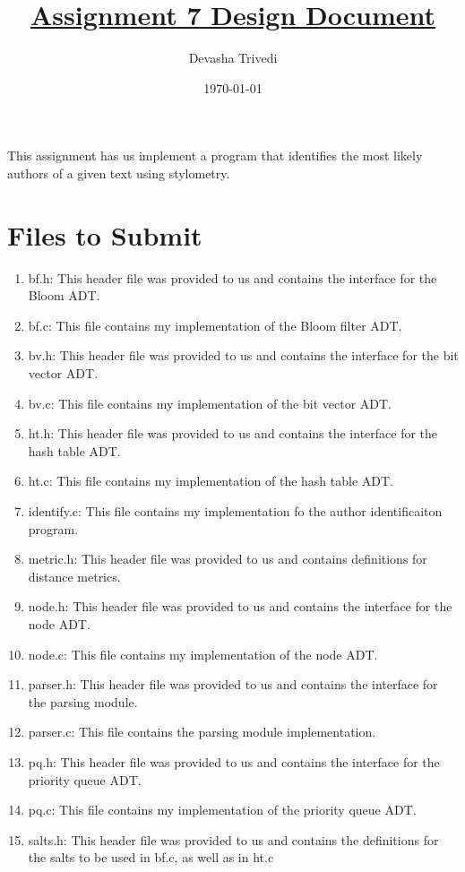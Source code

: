 \documentclass[12pt]{article}
\title{\textbf{\underline{Assignment 7 Design Document}}}
\author{Devasha Trivedi}
\date{\today}
\begin{document}
\maketitle
This assignment has us implement a program that identifies the most likely authors of a given text using stylometry.

\section{Files to Submit}\label{ss:deliverables}
\begin{enumerate}
    \item bf.h: This header file was provided to us and contains the interface for the Bloom ADT.
    \item bf.c: This file contains my implementation of the Bloom filter ADT.
    \item bv.h: This header file was provided to us and contains the interface for the bit vector ADT.
    \item bv.c: This file contains my implementation of the bit vector ADT.
    \item ht.h: This header file was provided to us and contains the interface for the hash table ADT.
    \item ht.c: This file contains my implementation of the hash table ADT.
    \item identify.c: This file contains my implementation fo the author identificaiton program.
    \item metric.h: This header file was provided to us and contains definitions for distance metrics.
    \item node.h: This header file was provided to us and contains the interface for the node ADT.
    \item node.c: This file contains my implementation of the node ADT.
    \item parser.h: This header file was provided to us and contains the interface for the parsing module.
    \item parser.c: This file contains the parsing module implementation.
    \item pq.h: This header file was provided to us and contains the interface for the priority queue ADT.
    \item pq.c: This file contains my implementation of the priority queue ADT.
    \item salts.h: This header file was provided to us and contains the definitions for the salts to be used in bf.c, as well as in ht.c

\end{enumerate}
\end{document}
